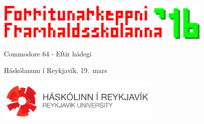 \documentclass[12pt,a4paper]{problemset}
\begin{document}
\begin{titlepage}
    \centering
    \includegraphics[width=0.8\textwidth]{fklogo}\\
    \vspace{1cm}
    {\Huge Commodore 64 - Eftir hádegi \par}
    \vspace{0.5cm}
    {\LARGE Háskólanum í Reykjavík, 19.\ mars \par}
    \vspace{2cm}
    { \Huge \tableofcontents }
    \vfill
    \includegraphics[width=0.6\textwidth]{horizontal_white.png}
\end{titlepage}

\setcounter{problemcount}{6}

\end{document}
